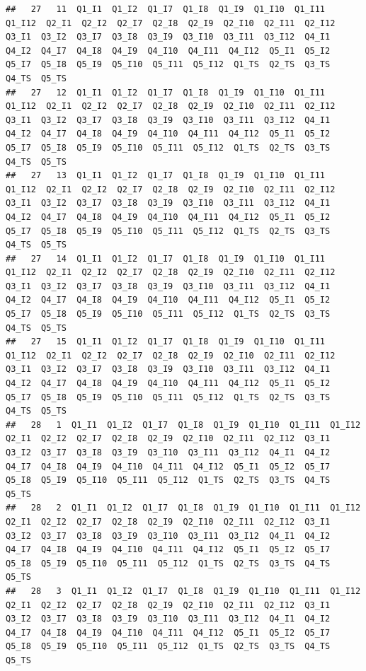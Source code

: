 \documentclass[
]{book}
\begin{document}
\begin{verbatim}
##   27   11  Q1_I1  Q1_I2  Q1_I7  Q1_I8  Q1_I9  Q1_I10  Q1_I11  Q1_I12  Q2_I1  Q2_I2  Q2_I7  Q2_I8  Q2_I9  Q2_I10  Q2_I11  Q2_I12  Q3_I1  Q3_I2  Q3_I7  Q3_I8  Q3_I9  Q3_I10  Q3_I11  Q3_I12  Q4_I1  Q4_I2  Q4_I7  Q4_I8  Q4_I9  Q4_I10  Q4_I11  Q4_I12  Q5_I1  Q5_I2  Q5_I7  Q5_I8  Q5_I9  Q5_I10  Q5_I11  Q5_I12  Q1_TS  Q2_TS  Q3_TS  Q4_TS  Q5_TS
##   27   12  Q1_I1  Q1_I2  Q1_I7  Q1_I8  Q1_I9  Q1_I10  Q1_I11  Q1_I12  Q2_I1  Q2_I2  Q2_I7  Q2_I8  Q2_I9  Q2_I10  Q2_I11  Q2_I12  Q3_I1  Q3_I2  Q3_I7  Q3_I8  Q3_I9  Q3_I10  Q3_I11  Q3_I12  Q4_I1  Q4_I2  Q4_I7  Q4_I8  Q4_I9  Q4_I10  Q4_I11  Q4_I12  Q5_I1  Q5_I2  Q5_I7  Q5_I8  Q5_I9  Q5_I10  Q5_I11  Q5_I12  Q1_TS  Q2_TS  Q3_TS  Q4_TS  Q5_TS
##   27   13  Q1_I1  Q1_I2  Q1_I7  Q1_I8  Q1_I9  Q1_I10  Q1_I11  Q1_I12  Q2_I1  Q2_I2  Q2_I7  Q2_I8  Q2_I9  Q2_I10  Q2_I11  Q2_I12  Q3_I1  Q3_I2  Q3_I7  Q3_I8  Q3_I9  Q3_I10  Q3_I11  Q3_I12  Q4_I1  Q4_I2  Q4_I7  Q4_I8  Q4_I9  Q4_I10  Q4_I11  Q4_I12  Q5_I1  Q5_I2  Q5_I7  Q5_I8  Q5_I9  Q5_I10  Q5_I11  Q5_I12  Q1_TS  Q2_TS  Q3_TS  Q4_TS  Q5_TS
##   27   14  Q1_I1  Q1_I2  Q1_I7  Q1_I8  Q1_I9  Q1_I10  Q1_I11  Q1_I12  Q2_I1  Q2_I2  Q2_I7  Q2_I8  Q2_I9  Q2_I10  Q2_I11  Q2_I12  Q3_I1  Q3_I2  Q3_I7  Q3_I8  Q3_I9  Q3_I10  Q3_I11  Q3_I12  Q4_I1  Q4_I2  Q4_I7  Q4_I8  Q4_I9  Q4_I10  Q4_I11  Q4_I12  Q5_I1  Q5_I2  Q5_I7  Q5_I8  Q5_I9  Q5_I10  Q5_I11  Q5_I12  Q1_TS  Q2_TS  Q3_TS  Q4_TS  Q5_TS
##   27   15  Q1_I1  Q1_I2  Q1_I7  Q1_I8  Q1_I9  Q1_I10  Q1_I11  Q1_I12  Q2_I1  Q2_I2  Q2_I7  Q2_I8  Q2_I9  Q2_I10  Q2_I11  Q2_I12  Q3_I1  Q3_I2  Q3_I7  Q3_I8  Q3_I9  Q3_I10  Q3_I11  Q3_I12  Q4_I1  Q4_I2  Q4_I7  Q4_I8  Q4_I9  Q4_I10  Q4_I11  Q4_I12  Q5_I1  Q5_I2  Q5_I7  Q5_I8  Q5_I9  Q5_I10  Q5_I11  Q5_I12  Q1_TS  Q2_TS  Q3_TS  Q4_TS  Q5_TS
##   28   1  Q1_I1  Q1_I2  Q1_I7  Q1_I8  Q1_I9  Q1_I10  Q1_I11  Q1_I12  Q2_I1  Q2_I2  Q2_I7  Q2_I8  Q2_I9  Q2_I10  Q2_I11  Q2_I12  Q3_I1  Q3_I2  Q3_I7  Q3_I8  Q3_I9  Q3_I10  Q3_I11  Q3_I12  Q4_I1  Q4_I2  Q4_I7  Q4_I8  Q4_I9  Q4_I10  Q4_I11  Q4_I12  Q5_I1  Q5_I2  Q5_I7  Q5_I8  Q5_I9  Q5_I10  Q5_I11  Q5_I12  Q1_TS  Q2_TS  Q3_TS  Q4_TS  Q5_TS
##   28   2  Q1_I1  Q1_I2  Q1_I7  Q1_I8  Q1_I9  Q1_I10  Q1_I11  Q1_I12  Q2_I1  Q2_I2  Q2_I7  Q2_I8  Q2_I9  Q2_I10  Q2_I11  Q2_I12  Q3_I1  Q3_I2  Q3_I7  Q3_I8  Q3_I9  Q3_I10  Q3_I11  Q3_I12  Q4_I1  Q4_I2  Q4_I7  Q4_I8  Q4_I9  Q4_I10  Q4_I11  Q4_I12  Q5_I1  Q5_I2  Q5_I7  Q5_I8  Q5_I9  Q5_I10  Q5_I11  Q5_I12  Q1_TS  Q2_TS  Q3_TS  Q4_TS  Q5_TS
##   28   3  Q1_I1  Q1_I2  Q1_I7  Q1_I8  Q1_I9  Q1_I10  Q1_I11  Q1_I12  Q2_I1  Q2_I2  Q2_I7  Q2_I8  Q2_I9  Q2_I10  Q2_I11  Q2_I12  Q3_I1  Q3_I2  Q3_I7  Q3_I8  Q3_I9  Q3_I10  Q3_I11  Q3_I12  Q4_I1  Q4_I2  Q4_I7  Q4_I8  Q4_I9  Q4_I10  Q4_I11  Q4_I12  Q5_I1  Q5_I2  Q5_I7  Q5_I8  Q5_I9  Q5_I10  Q5_I11  Q5_I12  Q1_TS  Q2_TS  Q3_TS  Q4_TS  Q5_TS

\end{verbatim}
\end{document}

